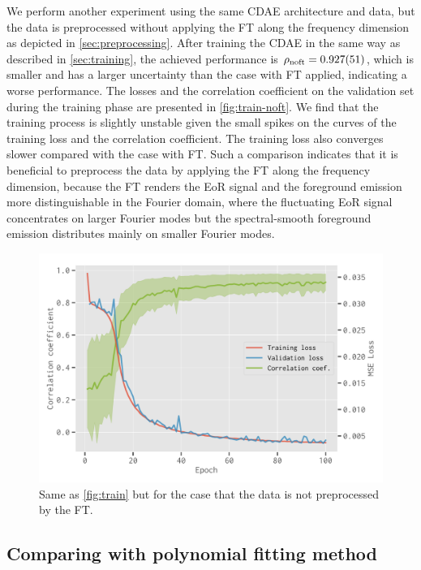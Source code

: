 \documentclass[letters,fleqn,usenatbib,onecolumn]{mnras}
\newcommand{\R}[1]{\mathrm{#1}}
\begin{document}
We perform another experiment using the same CDAE architecture and data,
but the data is preprocessed without applying the FT along the
frequency dimension as depicted in \autoref{sec:preprocessing}.
After training the CDAE in the same way as described in
\autoref{sec:training}, the achieved performance is
$\rho_{\R{noft}} = \num{0.927 +- 0.051}$, which is smaller and has a
larger uncertainty than the case with FT applied, indicating a worse
performance.
The losses and the correlation coefficient on the validation set
during the training phase are presented in \autoref{fig:train-noft}.
We find that the training process is slightly unstable given the small
spikes on the curves of the training loss and the correlation
coefficient.
The training loss also converges slower compared with the case with FT.
Such a comparison indicates that it is beneficial to preprocess the
data by applying the FT along the frequency dimension, because the FT
renders the EoR signal and the foreground emission more distinguishable
in the Fourier domain, where the fluctuating EoR signal concentrates on
larger Fourier modes but the spectral-smooth foreground emission
distributes mainly on smaller Fourier modes.

\begin{figure}
  \centering
  \includegraphics[width=\myfigwidth]{cdae-train-noft}
  \caption{\label{fig:train-noft}%
    Same as \autoref{fig:train} but for the case that the data is not
    preprocessed by the FT.
  }
\end{figure}


\subsection{Comparing with polynomial fitting method}
\label{sec:polyfit}
\end{document}
